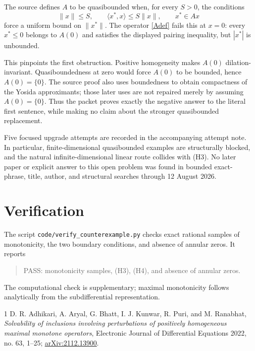 \documentclass[11pt]{article}
\begin{document}
The source defines $A$ to be quasibounded when, for every $S>0$, the conditions
\[
 \|x\|\leq S,\qquad \langle x^*,x\rangle\leq S\|x\|,
 \qquad x^*\in Ax
\]
force a uniform bound on $\|x^*\|$.  The operator \eqref{Adef} fails this at $x=0$: every $x^*\leq0$ belongs to $A(0)$ and satisfies the displayed pairing inequality, but $|x^*|$ is unbounded.

This pinpoints the first obstruction.  Positive homogeneity makes $A(0)$ dilation-invariant.  Quasiboundedness at zero would force $A(0)$ to be bounded, hence $A(0)=\{0\}$.  The source proof also uses boundedness to obtain compactness of the Yosida approximants; those later uses are not repaired merely by assuming $A(0)=\{0\}$.  Thus the packet proves exactly the negative answer to the literal first sentence, while making no claim about the stronger quasibounded replacement.

Five focused upgrade attempts are recorded in the accompanying attempt note.  In particular, finite-dimensional quasibounded examples are structurally blocked, and the natural infinite-dimensional linear route collides with (H3).  No later paper or explicit answer to this open problem was found in bounded exact-phrase, title, author, and structural searches through 12 August 2026.

\section{Verification}

The script \texttt{code/verify\_counterexample.py} checks exact rational samples of monotonicity, the two boundary conditions, and absence of annular zeros.  It reports
\begin{quote}\ttfamily
PASS: monotonicity samples, (H3), (H4), and absence of annular zeros.
\end{quote}
The computational check is supplementary; maximal monotonicity follows analytically from the subdifferential representation.

\begin{thebibliography}{1}
D. R. Adhikari, A. Aryal, G. Bhatt, I. J. Kunwar, R. Puri, and M. Ranabhat,
\emph{Solvability of inclusions involving perturbations of positively homogeneous maximal monotone operators},
Electronic Journal of Differential Equations 2022, no. 63, 1--25;
\href{https://arxiv.org/abs/2112.13900}{arXiv:2112.13900}.
\end{thebibliography}
\end{document}
